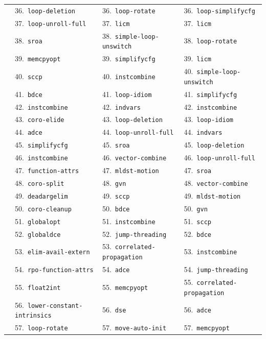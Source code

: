 \documentclass[11pt,a4paper]{article}
\begin{document}
{\begin{longtable}{llll}
 & 36.~\texttt{loop-deletion} & 36.~\texttt{loop-rotate} & 36.~\texttt{loop-simplifycfg} \\
 & 37.~\texttt{loop-unroll-full} & 37.~\texttt{licm} & 37.~\texttt{licm} \\
 & 38.~\texttt{sroa} & 38.~\texttt{simple-loop-unswitch} & 38.~\texttt{loop-rotate} \\
 & 39.~\texttt{memcpyopt} & 39.~\texttt{simplifycfg} & 39.~\texttt{licm} \\
 & 40.~\texttt{sccp} & 40.~\texttt{instcombine} & 40.~\texttt{simple-loop-unswitch} \\
 & 41.~\texttt{bdce} & 41.~\texttt{loop-idiom} & 41.~\texttt{simplifycfg} \\
 & 42.~\texttt{instcombine} & 42.~\texttt{indvars} & 42.~\texttt{instcombine} \\
 & 43.~\texttt{coro-elide} & 43.~\texttt{loop-deletion} & 43.~\texttt{loop-idiom} \\
 & 44.~\texttt{adce} & 44.~\texttt{loop-unroll-full} & 44.~\texttt{indvars} \\
 & 45.~\texttt{simplifycfg} & 45.~\texttt{sroa} & 45.~\texttt{loop-deletion} \\
 & 46.~\texttt{instcombine} & 46.~\texttt{vector-combine} & 46.~\texttt{loop-unroll-full} \\
 & 47.~\texttt{function-attrs} & 47.~\texttt{mldst-motion} & 47.~\texttt{sroa} \\
 & 48.~\texttt{coro-split} & 48.~\texttt{gvn} & 48.~\texttt{vector-combine} \\
 & 49.~\texttt{deadargelim} & 49.~\texttt{sccp} & 49.~\texttt{mldst-motion} \\
 & 50.~\texttt{coro-cleanup} & 50.~\texttt{bdce} & 50.~\texttt{gvn} \\
 & 51.~\texttt{globalopt} & 51.~\texttt{instcombine} & 51.~\texttt{sccp} \\
 & 52.~\texttt{globaldce} & 52.~\texttt{jump-threading} & 52.~\texttt{bdce} \\
 & 53.~\texttt{elim-avail-extern} & 53.~\texttt{correlated-propagation} & 53.~\texttt{instcombine} \\
 & 54.~\texttt{rpo-function-attrs} & 54.~\texttt{adce} & 54.~\texttt{jump-threading} \\
 & 55.~\texttt{float2int} & 55.~\texttt{memcpyopt} & 55.~\texttt{correlated-propagation} \\
 & 56.~\texttt{lower-constant-intrinsics} & 56.~\texttt{dse} & 56.~\texttt{adce} \\
 & 57.~\texttt{loop-rotate} & 57.~\texttt{move-auto-init} & 57.~\texttt{memcpyopt} \\

\end{longtable}}
\end{document}
